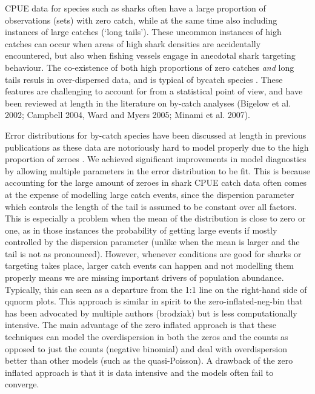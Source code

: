 CPUE data for species such as sharks often have a large proportion of observations (sets) with zero catch, while at the same time also including instances of large catches (`long tails'). These uncommon instances of high catches can occur when areas of high shark densities are accidentally encountered, but also when fishing vessels engage in anecdotal shark targeting behaviour. The co-existence of both high proportions of zero catches \emph{and} long tails resuls in over-dispersed data, and is typical of bycatch species \citep{Ward2005_a}. These features are challenging to account for from a statistical point of view, and have been reviewed at length in the literature on by-catch analyses (Bigelow et al.  2002; Campbell  2004, Ward and Myers  2005; Minami et al. 2007).

Error distributions for by-catch species have been discussed at length in previous publications as these data are notoriously hard to model properly due to the high proportion of zeroes \citep{...}. We achieved significant improvements in model diagnostics by allowing multiple parameters in the error distribution to be fit. This is because accounting for the large amount of zeroes in shark CPUE catch data often comes at the expense of modelling large catch events, since the dispersion parameter which controls the length of the tail is assumed to be constant over all factors. This is especially a problem when the mean of the distribution is close to zero or one, as in those instances the probability of getting large events if mostly controlled by the dispersion parameter (unlike when the mean is larger and the tail is not as pronounced). However, whenever conditions are good for sharks or targeting takes place, larger catch events can happen and not modelling them properly means we are missing important drivers of population abundance. Typically, this can seen as a departure from the 1:1 line on the right-hand side of qqnorm plots.
This approach is similar in spirit to the zero-inflated-neg-bin that has been advocated by multiple authors (brodziak) but is less computationally intensive.
The main advantage of the zero inflated approach is that these techniques can model the overdispersion in both the zeros and the counts as opposed to just the counts (negative binomial) and deal with overdispersion better than other models (such as the quasi-Poisson). A drawback of the zero inflated approach is that it is data intensive and the models often fail to converge.



